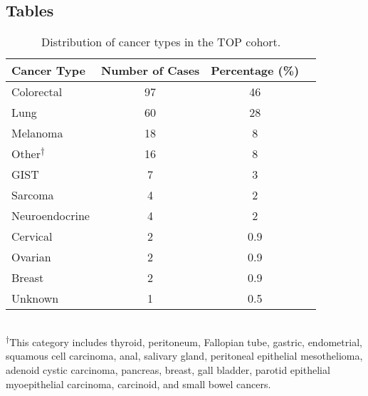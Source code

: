 \documentclass{bmcart}
\begin{document}
\begin{backmatter}
\FloatBarrier




\section*{Tables}

\begin{table}[H]
\caption{Distribution of cancer types in the TOP cohort.}
\label{cancertypes}
\centering
      \begin{tabular}{lccc}
        \hline
        Cancer Type & Number of Cases & Percentage (\%) \\ \hline
        Colorectal & 97 & 46 \\
        Lung & 60 & 28 \\
        Melanoma & 18 & 8 \\
				Other\textsuperscript{$\dagger$} & 16 & 8 \\
				GIST & 7 & 3 \\
				Sarcoma & 4 & 2 \\
				Neuroendocrine & 4 & 2 \\
				Cervical & 2 & 0.9 \\
				Ovarian & 2 & 0.9 \\
				Breast & 2 & 0.9 \\
				Unknown & 1 & 0.5 \\ \hline
      \end{tabular} \\
			\vspace{0.3cm}
\justify
\textsuperscript{$\dagger$}This category includes thyroid, peritoneum, Fallopian tube, gastric, endometrial, squamous cell carcinoma, anal, salivary gland, peritoneal epithelial mesothelioma, adenoid cystic carcinoma, pancreas, breast, gall bladder, parotid epithelial myoepithelial carcinoma, carcinoid, and small bowel cancers.
\end{table}


\end{backmatter}
\end{document}
